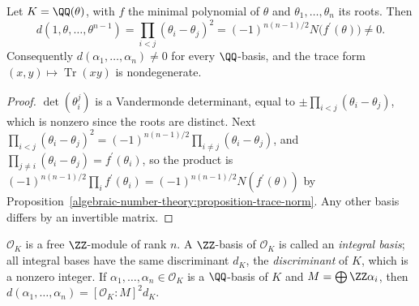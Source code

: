 \begin{proposition}\label{algebraic-number-theory:proposition-discriminant-power-basis}
Let $K = \QQ(\theta)$, with $f$ the minimal polynomial of $\theta$ and $\theta_1, \dots, \theta_n$ its roots. Then
\[
d(1, \theta, \dots, \theta^{n-1}) = \prod_{i < j}(\theta_i - \theta_j)^2 = (-1)^{n(n-1)/2}N\bigl(f^{\prime}(\theta)\bigr) \neq 0.
\]
Consequently $d(\alpha_1, \dots, \alpha_n) \neq 0$ for every $\QQ$-basis, and the trace form $(x, y) \mapsto \operatorname{Tr}(xy)$ is nondegenerate.
\end{proposition}

\begin{proof}
$\det(\theta_i^{j})$ is a Vandermonde determinant, equal to $\pm\prod_{i < j}(\theta_i - \theta_j)$, which is nonzero since the roots are distinct. Next
$\prod_{i < j}(\theta_i - \theta_j)^2 = (-1)^{n(n-1)/2}\prod_{i \neq j}(\theta_i - \theta_j)$, and $\prod_{j \neq i}(\theta_i - \theta_j) = f^{\prime}(\theta_i)$, so the product is
$(-1)^{n(n-1)/2}\prod_if^{\prime}(\theta_i) = (-1)^{n(n-1)/2}N(f^{\prime}(\theta))$ by Proposition~\ref{algebraic-number-theory:proposition-trace-norm}. Any other basis differs by an invertible matrix.
\end{proof}

\begin{theorem}\label{algebraic-number-theory:theorem-integral-basis}
$\mathcal{O}_K$ is a free $\ZZ$-module of rank $n$. A $\ZZ$-basis of $\mathcal{O}_K$ is called an \emph{integral basis}; all integral bases have the same discriminant $d_K$, the \emph{discriminant} of $K$,
which is a nonzero integer. If $\alpha_1, \dots, \alpha_n \in \mathcal{O}_K$ is a $\QQ$-basis of $K$ and $M = \bigoplus\ZZ\alpha_i$, then $d(\alpha_1, \dots, \alpha_n) = [\mathcal{O}_K : M]^2d_K$.
\end{theorem}

